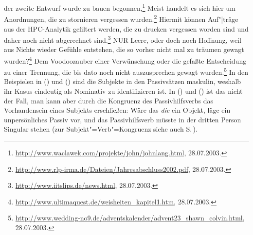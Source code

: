 \ea
\label{bsp-wurde-zu-bauen-begonnen}%
der zweite Entwurf wurde zu bauen begonnen,\footnote{
\url{http://www.waclawek.com/projekte/john/johnlang.html}, 28.07.2003.
}
\z
\eal
\ex Meist handelt es sich hier um Anordnungen, die zu stornieren vergessen wurden.\footnote{
        \url{http://www.rlp-irma.de/Dateien/Jahresabschluss2002.pdf}, 28.07.2003.
}
\ex Hiermit können Auf"|träge aus der HPC-Analytik gefiltert werden, die zu drucken vergessen worden sind 
    und daher noch nicht abgerechnet sind.\footnote{
        \url{http://www.iitslips.de/news.html}, 28.07.2003.
}
\zl
\eal
\ex NUR Leere, oder doch noch Hoffnung, weil aus Nichts wieder Gefühle entstehen,
    die so vorher nicht mal zu träumen gewagt wurden?\footnote{
        \url{http://www.ultimaquest.de/weisheiten_kapitel1.htm}, 28.07.2003.
}
\ex Dem Voodoozauber einer Verwünschung oder die gefaßte Entscheidung zu einer Trennung,
    die bis dato noch nicht auszusprechen gewagt wurden.\footnote{
        \url{http://www.wedding-no9.de/adventskalender/advent23_shawn_colvin.html}, 28.07.2003.
}
\zl
%
\largerpage
In den Beispielen in () und () sind die Subjekte in den Passivsätzen
maskulin, weshalb ihr Kasus eindeutig als Nominativ zu identifizieren ist. In () und
() ist das nicht der Fall, man kann aber durch die Kongruenz des Passivhilfsverbs
das Vorhandensein eines Subjekts erschließen: Wäre das \emph{die} ein Objekt,
läge ein unpersönliches Passiv vor, und das Passivhilfsverb müsste in der dritten Person
Singular stehen (zur Subjekt"=Verb"=Kongruenz siehe auch S.\,\pageref{bsp-kongruenz-passiv}).

